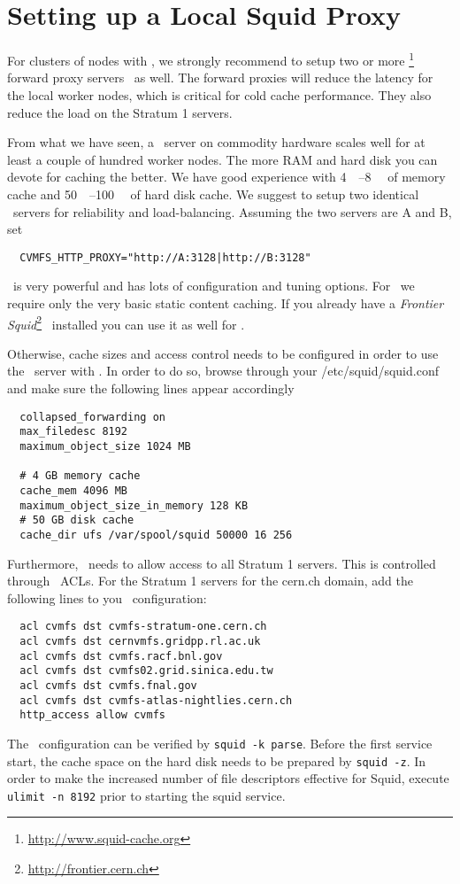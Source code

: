 \chapter{Setting up a Local Squid Proxy}
\label{sct:squid}

For clusters of nodes with \cvmfs, we strongly recommend to setup two or more \squid\footnote{\url{http://www.squid-cache.org}} forward proxy servers~\cite{squid99, bloomsquid00} as well.
The forward proxies will reduce the latency for the local worker nodes, which is critical for cold cache performance. 
They also reduce the load on the Stratum 1 servers.

From what we have seen, a \squid\ server on commodity hardware scales well for at least a couple of hundred worker nodes.
The more RAM and hard disk you can devote for caching the better.
We have good experience with \SIrange{4}{8}{\giga\byte} of memory cache and \SIrange{50}{100}{\giga\byte} of hard disk cache.
We suggest to setup two identical \squid\ servers for reliability and load-balancing.
Assuming the two servers are A and B, set
\begin{verbatim}
  CVMFS_HTTP_PROXY="http://A:3128|http://B:3128"
\end{verbatim}

\squid\ is very powerful and has lots of configuration and tuning options.
For \cvmfs\ we require only the very basic static content caching.
If you already have a \emph{Frontier Squid}\footnote{\url{http://frontier.cern.ch}}~\cite{frontier08, frontier10} installed you can use it as well for \cvmfs.

Otherwise, cache sizes and access control needs to be configured in order to use the \squid\ server with \cvmfs.
In order to do so, browse through your /etc/squid/squid.conf and make sure the following lines appear accordingly
\begin{verbatim}
  collapsed_forwarding on
  max_filedesc 8192
  maximum_object_size 1024 MB

  # 4 GB memory cache
  cache_mem 4096 MB
  maximum_object_size_in_memory 128 KB
  # 50 GB disk cache
  cache_dir ufs /var/spool/squid 50000 16 256
\end{verbatim}

Furthermore, \squid\ needs to allow access to all Stratum 1 servers.
This is controlled through \squid\ ACLs.
For the Stratum 1 servers for the cern.ch domain, add the following lines to you \squid\ configuration:
\begin{verbatim}
  acl cvmfs dst cvmfs-stratum-one.cern.ch
  acl cvmfs dst cernvmfs.gridpp.rl.ac.uk
  acl cvmfs dst cvmfs.racf.bnl.gov
  acl cvmfs dst cvmfs02.grid.sinica.edu.tw
  acl cvmfs dst cvmfs.fnal.gov
  acl cvmfs dst cvmfs-atlas-nightlies.cern.ch
  http_access allow cvmfs
\end{verbatim}

The \squid\ configuration can be verified by \texttt{squid -k parse}.
Before the first service start, the cache space on the hard disk needs to be prepared by \texttt{squid -z}.
In order to make the increased number of file descriptors effective for Squid, execute \texttt{ulimit -n 8192} prior to starting the squid service.

